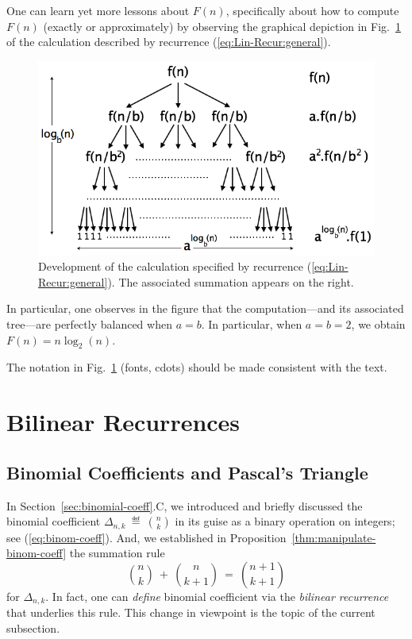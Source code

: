 One can learn yet more lessons about $F(n)$, specifically about how to
compute $F(n)$ (exactly or approximately) by observing the graphical
depiction in Fig.~\ref{fig:masterTheorem} of the calculation described
by recurrence (\ref{eq:Lin-Recur:general}).
\begin{figure}[htb]
\begin{center}
       \includegraphics[scale=0.4]{FiguresMaths/MasterTheoremgeneral}
\caption{Development of the calculation specified by recurrence
  (\ref{eq:Lin-Recur:general}).  The associated summation appears on
  the right.
\label{fig:masterTheorem}}
\end{center}
\end{figure}
In particular, one observes in the figure that the computation---and
its associated tree---are perfectly balanced when $a=b$.  In
particular, when $a=b=2$, we obtain $F(n) = n \log_2(n)$.

{\Arny The notation in Fig.~\ref{fig:masterTheorem} (fonts, cdots)
  should be made consistent with the text.}


\section{Bilinear Recurrences}
\label{sec:bilinear-recurrences}

\subsection{Binomial Coefficients and Pascal's Triangle}
\label{sec:binomial-coeff+Pascal}

In Section~\ref{sec:binomial-coeff}.C, we introduced and briefly
discussed the binomial coefficient 
$\displaystyle \Delta_{n,k} \ \eqdef \ {n \choose k}$ in its guise as a
binary operation on integers; see (\ref{eq:binom-coeff}).  And, we
established in Proposition~\ref{thm:manipulate-binom-coeff} the
summation rule
\[ {n \choose k} \ + \ {n \choose {k+1}} \ = \ {{n+1} \choose {k+1}} \]
for $\Delta_{n,k}$.  In fact, one can {\em define} binomial
coefficient via the {\em bilinear recurrence} that underlies this
rule.  This change in viewpoint is the topic of the current
subsection.

